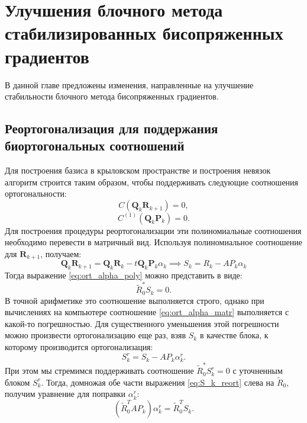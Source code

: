 \section{{\color{red}Улучшения} блочного метода стабилизированных бисопряженных градиентов}
\label{sec:Chapter3} 
В данной главе предложены изменения, направленные на улучшение стабильности блочного метода 
бисопряженных градиентов. 
\subsection{Реортогонализация для поддержания биортогональных соотношений}
Для построения базиса в крыловском пространстве и построения невязок алгоритм 
строится таким образом, чтобы поддерживать следующие соотношения ортогональности:
\begin{equation}
    \label{eq:ort_alpha_poly}
    C(\mathbf{Q}_{k} \mathbf{R}_{k+1}) = 0,
\end{equation}
\begin{equation}
    \label{eq:ort_beta_poly}
    C^{(1)}(\mathbf{Q}_{k} \mathbf{P}_k) = 0. 
\end{equation}
Для построения процедуры реортогонализации эти полиномиальные соотношения необходимо 
перевести в матричный вид.
Используя полиномиальное соотношение для $\mathbf{R}_{k+1}$, получаем:
$$\mathbf{Q}_{k}\mathbf{R}_{k+1} = \mathbf{Q}_{k}\mathbf{R}_{k} - t\mathbf{Q}_{k}\mathbf{P}_{k}\alpha_k \implies S_k = R_k - AP_k\alpha_k $$
Тогда выражение \eqref{eq:ort_alpha_poly} можно представить в виде:
\begin{equation}
    \label{eq:ort_alpha_matr}
    \tilde{R}_0^* S_k = 0.
\end{equation}
В точной арифметике это соотношение выполняется строго, однако при вычислениях на компьютере 
соотношение \eqref{eq:ort_alpha_matr} выполняется с какой-то погрешностью. Для существенного уменьшения 
этой погрешности можно произвести ортогонализацию еще раз, взяв $S_k$ в качестве блока, к которому производится
ортогонализация:
\begin{equation}
    \label{eq:S_k_reort}
    S_k^{r} = S_k - AP_k\alpha_k^r.
\end{equation}
При этом мы стремимся поддерживать соотношение $\tilde{R}_0^*S_k^r=0$ с уточненным блоком $S_k^r$.
Тогда, домножая обе части выражения \eqref{eq:S_k_reort} слева на $\tilde{R}_0$, получим уравнение для 
поправки $\alpha_k^r$:
\begin{equation*}
    (\tilde{R}_0^TAP_k)\alpha_k^r = \tilde{R}_0^TS_k.
\end{equation*}

